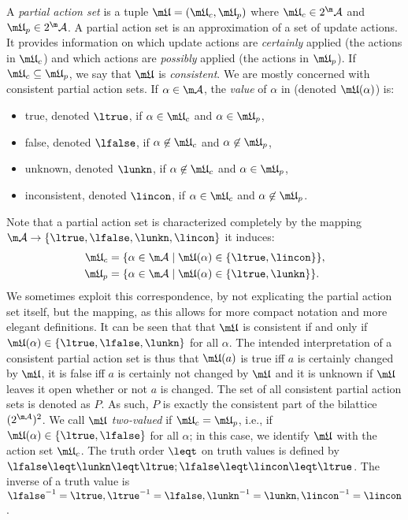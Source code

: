 A \emph{partial action set} is a tuple $\UUU=(\UUU_c,\UUU_{p})$ where $\UUU_c\in 2^\acts$ and $\UUU_p\in2^\acts$. 
A partial action set is an approximation of a set of update actions. It provides information on which update actions are \emph{certainly} applied (the actions in $\UUU_c$) and which actions are  \emph{possibly} applied (the actions in $\UUU_p$). If $\UUU_c\subseteq \UUU_p$, we say that $\UUU$ is \emph{consistent}. We are mostly concerned with consistent partial action sets. 
If $\alpha \in \acts$, the \emph{value} of $\alpha$ in \UUU (denoted $\UUU(\alpha)$) is:
\begin{itemize}
 \item true, denoted $\ltrue$, if $\alpha\in \UUU_c$ and $\alpha \in \UUU_p$,
 \item false, denoted $\lfalse$, if $\alpha\not \in \UUU_c$ and $\alpha\not\in\UUU_p$,
 \item unknown, denoted $\lunkn$, if $\alpha\not \in \UUU_c$ and $\alpha \in \UUU_p$,
 \item inconsistent, denoted $\lincon$, if $\alpha\in \UUU_c$ and $\alpha\not\in\UUU_p$.
\end{itemize}
Note that a partial action set is characterized completely by the mapping $\acts \to \{\ltrue,\lfalse,\lunkn, \lincon\}$ it induces: 
\begin{align*} \UUU_c &= \{\alpha \in \acts \mid \UUU(\alpha)\in \{\ltrue,\lincon\}\}, \\
\UUU_p &= \{\alpha \in \acts \mid \UUU(\alpha)\in \{\ltrue,\lunkn\}\}.
\end{align*}
We sometimes exploit this correspondence, by not explicating the partial action set itself, but the mapping, as this allows for more compact notation and more elegant definitions. 
It can be seen that that $\UUU$ is consistent if and only if $\UUU(\alpha) \in \{\ltrue,\lfalse,\lunkn\}$ for all $\alpha$. 
The intended interpretation of a consistent partial action set is thus that $\UUU(a)$ is true iff $a$ is certainly changed by $\UUU$, it is false iff $a$ is certainly not changed by $\UUU$ and it is unknown if $\UUU$ leaves it open whether or not $a$ is changed. 
The set of all consistent partial action sets is denoted as $P$. 
As such, $P$ is exactly the consistent part of the bilattice $(2^{\acts})^2$. 
We call $\UUU$ \emph{two-valued} if $\UUU_c = \UUU_p$, i.e., if $\UUU(\alpha)\in\{\ltrue,\lfalse\}$ for all $\alpha$; in this case, we identify $\UUU$ with the action set $\UUU_c$. 
The truth order $\leqt$ on truth values is defined by $\lfalse\leqt\lunkn\leqt\ltrue; \lfalse \leqt \lincon\leqt \ltrue$. The inverse of a truth value is $\lfalse^{-1}=\ltrue, \ltrue^{-1}=\lfalse, \lunkn^{-1}=\lunkn, \lincon^{-1}=\lincon$.

